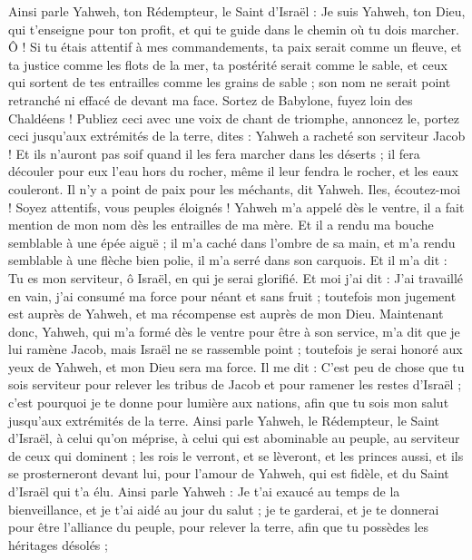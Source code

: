 \begin{multicols}{2}
Ainsi parle Yahweh, ton Rédempteur, le Saint d'Israël : Je suis Yahweh, ton Dieu, qui t'enseigne pour ton profit, et qui te guide dans le chemin où tu dois marcher.
Ô ! Si tu étais attentif à mes commandements, ta paix serait comme un fleuve, et ta justice comme les flots de la mer,
ta postérité serait comme le sable, et ceux qui sortent de tes entrailles comme les grains de sable ; son nom ne serait point retranché ni effacé de devant ma face.
Sortez de Babylone, fuyez loin des Chaldéens ! Publiez ceci avec une voix de chant de triomphe, annoncez le, portez ceci jusqu'aux extrémités de la terre, dites : Yahweh a racheté son serviteur Jacob !
Et ils n'auront pas soif quand il les fera marcher dans les déserts ; il fera découler pour eux l'eau hors du rocher, même il leur fendra le rocher, et les eaux couleront.
Il n'y a point de paix pour les méchants, dit Yahweh.
\VerseOne{}Iles, écoutez-moi ! Soyez attentifs, vous peuples éloignés ! Yahweh m'a appelé dès le ventre, il a fait mention de mon nom dès les entrailles de ma mère.
Et il a rendu ma bouche semblable à une épée aiguë ; il m'a caché dans l'ombre de sa main, et m'a rendu semblable à une flèche bien polie, il m'a serré dans son carquois.
Et il m'a dit : Tu es mon serviteur, ô Israël, en qui je serai glorifié.
Et moi j'ai dit : J'ai travaillé en vain, j'ai consumé ma force pour néant et sans fruit ; toutefois mon jugement est auprès de Yahweh, et ma récompense est auprès de mon Dieu.
Maintenant donc, Yahweh, qui m'a formé dès le ventre pour être à son service, m'a dit que je lui ramène Jacob, mais Israël ne se rassemble point ; toutefois je serai honoré aux yeux de Yahweh, et mon Dieu sera ma force.
Il me dit : C'est peu de chose que tu sois serviteur pour relever les tribus de Jacob et pour ramener les restes d'Israël ; c'est pourquoi je te donne pour lumière aux nations, afin que tu sois mon salut jusqu'aux extrémités de la terre.
Ainsi parle Yahweh, le Rédempteur, le Saint d'Israël, à celui qu'on méprise, à celui qui est abominable au peuple, au serviteur de ceux qui dominent ; les rois le verront, et se lèveront, et les princes aussi, et ils se prosterneront devant lui, pour l'amour de Yahweh, qui est fidèle, et du Saint d'Israël qui t'a élu.
Ainsi parle Yahweh : Je t'ai exaucé au temps de la bienveillance, et je t'ai aidé au jour du salut ; je te garderai, et je te donnerai pour être l'alliance du peuple, pour relever la terre, afin que tu possèdes les héritages désolés ;

\end{multicols}
